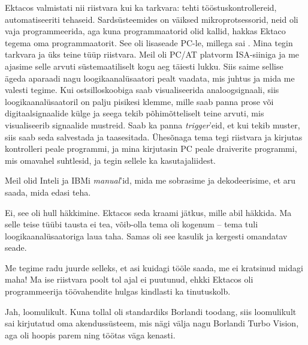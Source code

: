 Ektacos valmistati nii riistvara kui ka tarkvara: tehti 
tööstuskontrollereid, automatiseeriti tehaseid. Sardsüsteemides on väiksed mikroprotsessorid, neid oli vaja programmeerida, aga 
kuna programmaatorid olid kallid, hakkas Ektaco tegema oma 
programmaatorit. See oli lisaseade PC-le, millega sai
. Mina tegin tarkvara ja üks teine tüüp riistvara. Meil oli 
PC/AT platvorm ISA-siiniga ja me ajasime selle arvuti süstemaatiliselt kogu aeg 
täiesti lukku. Siis saime sellise ägeda aparaadi nagu
loogikaanalüsaatori pealt vaadata, mis juhtus ja mida me 
valesti tegime. Kui 
ostsilloskoobiga saab visualiseerida analoogsignaali, siis 
loogikaanalüsaatoril on palju pisikesi klemme, mille saab panna prose 
või digitaalsignaalide külge ja seega tekib põhimõtteliselt teine arvuti, mis  
visualiseerib signaalide mustreid. Saab ka panna 
\emph{trigger}'eid, et kui tekib muster, siis saab seda salvestada ja 
taasesitada. Ühesõnaga tema tegi riistvara ja kirjutas  
kontrolleri peale programmi, ja mina kirjutasin PC peale 
draiverite programmi, mis omavahel suhtlesid, ja tegin sellele ka 
kasutajaliidest.

Meil olid Inteli ja IBMi \emph{manual}'id, mida me 
sobrasime ja dekodeerisime, et aru saada, mida edasi teha. 



Ei, see oli hull häkkimine. Ektacos seda kraami jätkus, mille abil häkkida. Ma selle 
teise tüübi tausta ei tea, võib-olla tema oli kogenum -- tema tuli 
loogikaanalüsaatoriga laua taha. Samas oli see 
kasulik ja kergesti omandatav seade. 


Me tegime radu juurde selleks, et asi kuidagi tööle saada, me ei 
kratsinud midagi maha! Ma ise riistvara poolt tol ajal ei puutunud, ehkki 
Ektacos oli programmeerija töövahendite hulgas kindlasti ka tinutuskolb. 



Jah, loomulikult. Kuna tollal oli standardiks Borlandi
toodang, siis loomulikult sai kirjutatud oma akendussüsteem, mis nägi välja nagu 
Borlandi Turbo Vision, aga oli hoopis parem ning töötas väga 
kenasti. 

